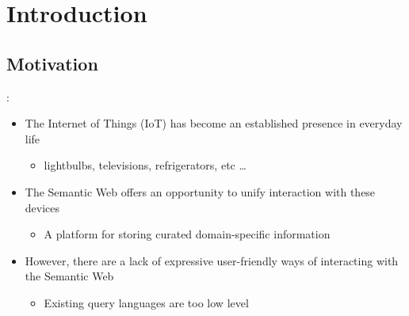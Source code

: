 \documentclass[logoontitle,tabu,supertabular,aspectratio=43]{preney-uwindsor-beamer}
\begin{document}
	\section{Introduction}

    \subsection{Motivation}
    \begin{frame}{\insertsection: \insertsubsection}
        \begin{itemize}
            \item The Internet of Things (IoT) has become an established presence in everyday life
            \begin{itemize}
                \item lightbulbs, televisions, refrigerators, etc \ldots
            \end{itemize}
            \item The Semantic Web offers an opportunity to unify interaction with these devices
            \begin{itemize}
                \item  A platform for storing curated domain-specific information
            \end{itemize}
            \item However, there are a lack of expressive user-friendly ways of interacting with the Semantic Web
            \begin{itemize}
                \item Existing query languages are too low level
            \end{itemize}
        \end{itemize}
    \end{frame}

\end{document}
